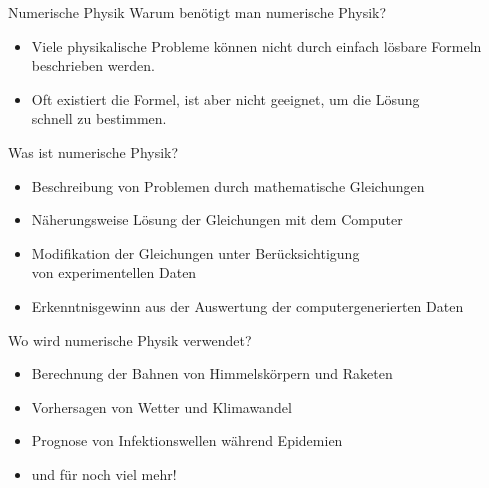 \documentclass[
  a0paper,
  portrait,
  fontscale=.35 %
  ]{baposterrptu}
\begin{document}
\begin{poster}
\begin{posterbox}[name=intro,column=0,row=0]{Numerische Physik}
    Warum benötigt man numerische Physik?
    \begin{itemize}
      \item Viele physikalische Probleme können nicht durch einfach lösbare Formeln beschrieben werden.
      \item Oft existiert die Formel, ist aber nicht geeignet, um die Lösung\\ schnell zu bestimmen.
    \end{itemize}
    \vspace{1em}
    Was ist numerische Physik?
    \begin{itemize}
      \item Beschreibung von Problemen durch mathematische Gleichungen 
      \item Näherungsweise Lösung der Gleichungen mit dem Computer
      \item Modifikation der Gleichungen unter Berücksichtigung\\ von experimentellen Daten
      \item Erkenntnisgewinn aus der Auswertung der computergenerierten Daten
    \end{itemize}
    \vspace{1em}
    Wo wird numerische Physik verwendet?
    \begin{itemize}
      \item Berechnung der Bahnen von Himmelskörpern und Raketen
      \item Vorhersagen von Wetter und Klimawandel
      \item Prognose von Infektionswellen während Epidemien
      \item und für noch viel mehr!
    \end{itemize}
    
  \end{posterbox}


\end{poster}
\end{document}

